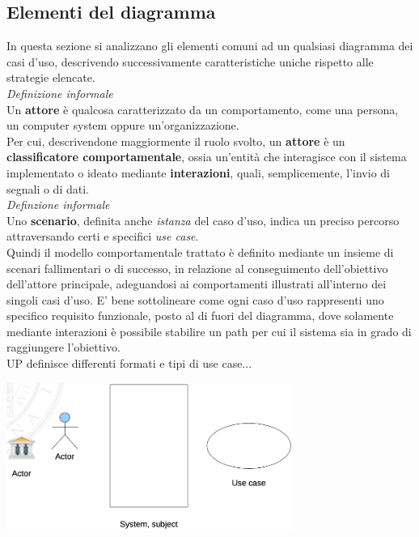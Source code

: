 \documentclass{article}
\begin{document}
\subsection*{Elementi del diagramma}
In questa sezione si analizzano gli elementi comuni ad un qualsiasi diagramma dei casi d'uso, descrivendo successivamente caratteristiche uniche rispetto alle strategie elencate.\vspace*{14pt}\\
\textit{Definizione informale}\\
Un \textbf{attore} è qualcosa caratterizzato da un comportamento, come una persona, un computer system oppure un'organizzazione.\vspace*{14pt}\\
Per cui, descrivendone maggiormente il ruolo svolto, un \textbf{attore} è un \textbf{classificatore comportamentale}, ossia un'entità che interagisce con il sistema implementato o ideato mediante \textbf{interazioni}, quali, semplicemente, l'invio di segnali o di dati.\vspace*{14pt}\\
\textit{Definzione informale}\\
Uno \textbf{scenario}, definita anche \textit{istanza} del caso d'uso, indica un preciso percorso attraversando certi e specifici \textit{use case}.\vspace*{14pt}\\
Quindi il modello comportamentale trattato è definito mediante un insieme di scenari fallimentari o di successo, in relazione al conseguimento dell'obiettivo dell'attore principale, adeguandosi ai comportamenti illustrati all'interno dei singoli casi d'uso. E' bene sottolineare come ogni caso d'uso rappresenti uno specifico requisito funzionale, posto al di fuori del diagramma, dove solamente mediante interazioni è possibile stabilire un path per cui il sistema sia in grado di raggiungere l'obiettivo.\\
UP definisce differenti formati e tipi di use case...

\pagebreak
\begin{center}
    \includegraphics[width=0.7\textwidth]{foto 1.png}
\end{center}
\end{document}
